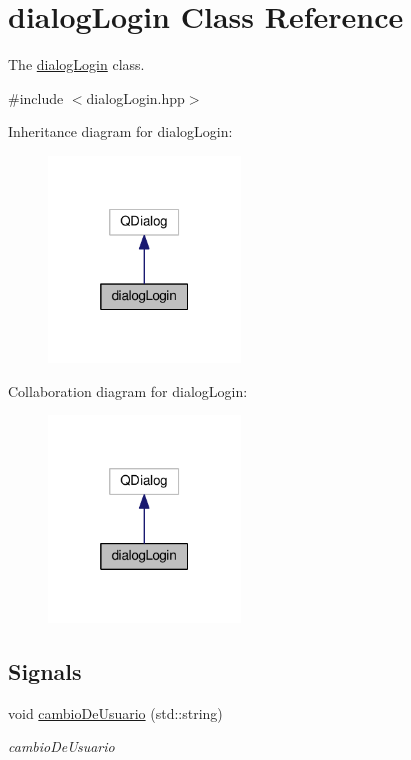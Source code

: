 \hypertarget{classdialogLogin}{}\section{dialog\+Login Class Reference}
\label{classdialogLogin}


The \hyperlink{classdialogLogin}{dialog\+Login} class.  




{\ttfamily \#include $<$dialog\+Login.\+hpp$>$}



Inheritance diagram for dialog\+Login\+:
\nopagebreak
\begin{figure}[H]
\begin{center}
\leavevmode
\includegraphics[width=145pt]{classdialogLogin__inherit__graph}
\end{center}
\end{figure}


Collaboration diagram for dialog\+Login\+:
\nopagebreak
\begin{figure}[H]
\begin{center}
\leavevmode
\includegraphics[width=145pt]{classdialogLogin__coll__graph}
\end{center}
\end{figure}
\subsection*{Signals}
\begin{DoxyCompactItemize}
\item 
\hypertarget{classdialogLogin_a051d47d5652799fb46105756e30d60a4}{}void \hyperlink{classdialogLogin_a051d47d5652799fb46105756e30d60a4}{cambio\+De\+Usuario} (std\+::string)\label{classdialogLogin_a051d47d5652799fb46105756e30d60a4}

\begin{DoxyCompactList}\small\item\em cambio\+De\+Usuario \end{DoxyCompactList}\end{DoxyCompactItemize}
